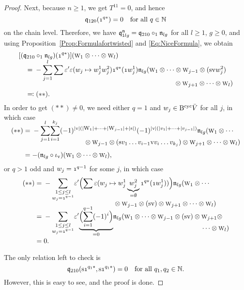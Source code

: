 \documentclass[\MainFolder/Text.tex]{subfiles}
\begin{document}
\begin{proof}
Next, because $n\ge 1$, we get $T^{11} = 0$, and hence 
$$ \OPQ_{120}(\NOne^{q*}) = 0\quad\text{for all }q\in \N$$
on the chain level. Therefore, we have $\mathfrak{q}_{1lg}^{\mathfrak{n}} = \mathfrak{q}_{210}\circ_1 \mathfrak{n}_{lg}$ for all $l\ge 1$, $g\ge 0$, and  using Proposition~\ref{Prop:Formulafortwisted} and \eqref{Eq:NiceFormula}, we obtain 
\allowdisplaybreaks
\begin{align*}
&[(\OPQ_{210}\circ_1 \PMC_{lg})(\NOne^{q*})](\W_1 \otimes \dotsb \otimes \W_l) \\[\jot]
&\quad= \begin{multlined}[t]-\smash{\sum_{j=1}^l} \sum \varepsilon' \varepsilon(w_j \mapsto w_j^1 w_j^2) \NOne^{q*}(\NOne w_j^1) \PMC_{lg}(\W_1 \otimes \dotsb \otimes \W_{j-1} \otimes (\Susp \NVol w_j^2) \\[\jot] \otimes \W_{j+1}\otimes \dotsb \otimes \W_l)\end{multlined}\\
&\quad\eqqcolon(**).
\end{align*}
In order to get $(**)\neq 0$, we need either $q=1$ and $w_j \in \mathrm{B}^{\mathrm{cyc}} \bar{V}$ for all $j$, in which case
\allowdisplaybreaks
\begin{align*}
(**) &= \begin{multlined}[t]-\smash{\sum_{j=1}^l} \smash{\sum_{i=1}^{k_j}} (-1)^{\Abs{\NVol}(\Abs{\W_1}+ \dotsb + \Abs{\W_{j-1}} + \Abs{\Susp})}(-1)^{\Abs{\NVol}(\Abs{v_1} + \dotsb + \Abs{v_{j-1}})}\PMC_{lg}(\W_1 \otimes \dotsb \\[\jot] \otimes \W_{j-1} \otimes (\Susp v_1 \dots v_{i-1} \NVol v_{i} \dots v_{k_j}) \otimes \W_{j+1}\otimes \dotsb\otimes \W_l)\end{multlined} \\[\jot]
 &= -(\PMC_{lg} \circ \iota_\NVol)(\W_1 \otimes \dotsb \otimes \W_l),
\end{align*}
or $q>1$ odd and $w_j = \NOne^{q-1}$ for some $j$, in which case
\allowdisplaybreaks
\begin{align*}
(**) &=\begin{multlined}[t]-\smash{\sum_{\substack{1\le j \le l \\ w_j = \NOne^{q-1}}}} \varepsilon' \Bigl(\sum \varepsilon(w_j \mapsto w_j^1 \underbrace{w_{j}^2}_{=\emptyset} \NOne^{q*}(\NOne w_j^1)) \Bigr) \PMC_{lg}(\W_1\otimes \dotsb \\ \otimes\W_{j-1}\otimes (\Susp\NVol)\otimes \W_{j+1} \otimes \dotsb \otimes \W_l )\end{multlined}\\[\jot]
&=\begin{multlined}[t]-\smash{\sum_{\substack{1\le j \le l \\ w_j = \NOne^{q-1}}}} \varepsilon' \smash{\underbrace{\Bigl( \sum_{i=1}^{q-1} (-1)^i \Bigr)}_{=0}} \PMC_{lg}(\W_1 \otimes \dotsb \otimes \W_{j-1} \otimes (\Susp \NVol) \otimes \W_{j+1} \otimes \\[\jot] \dotsb \otimes \W_l)\end{multlined}\\[\jot]
&=0.
\end{align*}

The only relation left to check is
$$ \OPQ_{210}(\Susp \NOne^{q_1 *},\Susp \NOne^{q_1 *}) = 0 \quad\text{for all } q_1, q_2 \in \N.$$
However, this is easy to see, and the proof is done. 
\end{proof}
\end{document}

